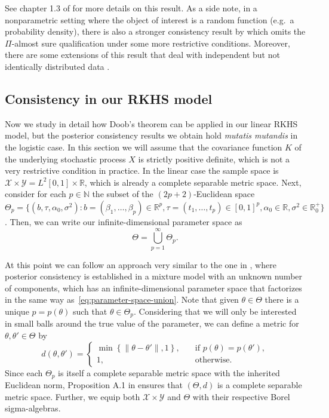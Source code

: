 \documentclass{article}
\numberwithin{equation}{section}
\theoremstyle{plain}
\theoremstyle{definition}
\newcommand{\N}{\mathbb{N}}
\newcommand{\R}{\mathbb{R}}
\begin{document}
See chapter 1.3 of \citet{ghosh2003bayesian} for more details on this result. As a side note, in a nonparametric setting where the object of interest is a random function (e.g.\ a probability density), there is also a stronger consistency result by \citet{schwartz1965bayes} which omits the \(\Pi\)-almost sure qualification under some more restrictive conditions. Moreover, there are some extensions of this result that deal with independent but not identically distributed data \citep{choi2008remarks}.

\subsection{Consistency in our RKHS model}

Now we study in detail how Doob's theorem can be applied in our linear RKHS model, but the posterior consistency results we obtain hold \textit{mutatis mutandis} in the logistic case. In this section we will assume that the covariance function \(K\) of the underlying stochastic process \(X\) is strictly positive definite, which is not a very restrictive condition in practice. In the linear case the sample space is \(\mathcal X \times \mathcal Y = L^2[0,1]\times \R\), which is already a complete separable metric space. Next, consider for each \(p\in\N\) the subset of the \((2p+2)\)-Euclidean space \(\Theta_p = \{(b, \tau, \alpha_0, \sigma^2): b=(\beta_1,\dots,\beta_p) \in \R^p, \tau=(t_1,\dots,t_p) \in [0,1]^p, \alpha_0\in \R, \sigma^2 \in \R^+_0\}\). Then, we can write our infinite-dimensional parameter space as
\begin{equation}\label{eq:parameter-space-union}
  \Theta = \bigcup_{p=1}^\infty \Theta_p.
\end{equation}

At this point we can follow an approach very similar to the one in \citet{miller2023consistency}, where posterior consistency is established in a mixture model with an unknown number of components, which has an infinite-dimensional parameter space that factorizes in the same way as~\eqref{eq:parameter-space-union}. Note that given \(\theta \in \Theta\) there is a unique \(p=p(\theta)\) such that \(\theta \in \Theta_p\). Considering that we will only be interested in small balls around the true value of the parameter, we can define a metric for \(\theta, \theta' \in \Theta\) by
\begin{equation}\label{eq:metric-doob}
  d(\theta, \theta')= \begin{cases}
    \min \left\{\|\theta - \theta'\|, 1\right\}, \quad & \text{if } p(\theta)=p(\theta'), \\
    1, \quad                                           & \text{otherwise}.
  \end{cases}
\end{equation}
Since each \(\Theta_p\) is itself a complete separable metric space with the inherited Euclidean norm, Proposition A.1 in \citet{miller2023consistency} ensures that \((\Theta, d)\) is a complete separable metric space. Further, we equip both \(\mathcal X \times \mathcal Y\) and \(\Theta\) with their respective Borel sigma-algebras. 
\end{document}
